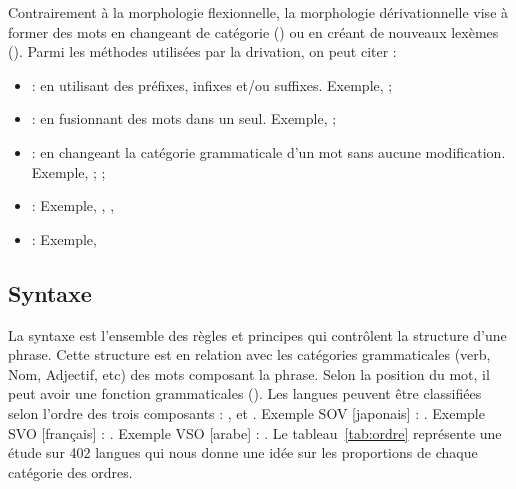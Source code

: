 \documentclass{KodeBook}
\begin{document}
Contrairement à la morphologie flexionnelle, la morphologie dérivationnelle vise à former des mots en changeant de catégorie () ou en créant de nouveaux lexèmes (). 
Parmi les méthodes utilisées par la drivation, on peut citer :
\begin{itemize}
	\item {} : en utilisant des préfixes, infixes et/ou suffixes. 
	Exemple, ; 
	
	\item {} : en fusionnant des mots dans un seul. 
	Exemple, ; 
	
	\item {} : en changeant la catégorie grammaticale d'un mot sans aucune modification. 
	Exemple, ; ; 
	
	\item {} : 
	Exemple, , , 
	
	\item {} : Exemple,  
	
\end{itemize}

\subsection{Syntaxe}

La syntaxe est l'ensemble des règles et principes qui contrôlent la structure d'une phrase. 
Cette structure est en relation avec les catégories grammaticales (verb, Nom, Adjectif, etc) des mots composant la phrase.
Selon la position du mot, il peut avoir une fonction grammaticales ().
Les langues peuvent être classifiées selon l'ordre des trois composants : ,  et .
Exemple SOV [japonais] : .
Exemple SVO [français] : .
Exemple VSO [arabe] : .
Le tableau~\ref{tab:ordre} représente une étude sur 402 langues qui nous donne une idée sur les proportions de chaque catégorie des ordres.
\end{document}
